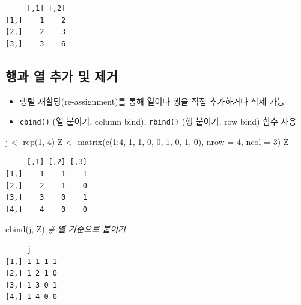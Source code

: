 \documentclass[
  11pt,
]{krantz}
\newenvironment{Shaded}{\begin{snugshade}}{\end{snugshade}}
\newcommand{\AttributeTok}[1]{\textcolor[rgb]{0.61,0.61,0.61}{#1}}
\newcommand{\CommentTok}[1]{\textcolor[rgb]{0.37,0.37,0.37}{\textit{#1}}}
\newcommand{\DecValTok}[1]{\textcolor[rgb]{0.06,0.06,0.06}{#1}}
\newcommand{\FunctionTok}[1]{\textcolor[rgb]{0,0,0}{#1}}
\newcommand{\NormalTok}[1]{#1}
\newcommand{\OtherTok}[1]{\textcolor[rgb]{0.37,0.37,0.37}{#1}}
\newcommand{\SpecialCharTok}[1]{\textcolor[rgb]{0,0,0}{#1}}
\providecommand{\tightlist}{%
  \setlength{\itemsep}{0pt}\setlength{\parskip}{0pt}}
\begin{document}
\begin{verbatim}
     [,1] [,2]
[1,]    1    2
[2,]    2    3
[3,]    3    6
\end{verbatim}

\normalsize

\hypertarget{uxd589uxacfc-uxc5f4-uxcd94uxac00-uxbc0f-uxc81cuxac70}{%
\subsection{행과 열 추가 및 제거}\label{uxd589uxacfc-uxc5f4-uxcd94uxac00-uxbc0f-uxc81cuxac70}}

\begin{itemize}
\tightlist
\item
  행렬 재할당(re-assignment)를 통해 열이나 행을 직접 추가하거나 삭제 가능
\item
  \texttt{cbind()} (열 붙이기, column bind), \texttt{rbind()} (행 붙이기, row bind) 함수 사용
\end{itemize}

\footnotesize

\begin{Shaded}
\begin{Highlighting}[]
\NormalTok{j }\OtherTok{\textless{}{-}} \FunctionTok{rep}\NormalTok{(}\DecValTok{1}\NormalTok{, }\DecValTok{4}\NormalTok{)}
\NormalTok{Z }\OtherTok{\textless{}{-}} \FunctionTok{matrix}\NormalTok{(}\FunctionTok{c}\NormalTok{(}\DecValTok{1}\SpecialCharTok{:}\DecValTok{4}\NormalTok{, }\DecValTok{1}\NormalTok{, }\DecValTok{1}\NormalTok{, }\DecValTok{0}\NormalTok{, }\DecValTok{0}\NormalTok{, }\DecValTok{1}\NormalTok{, }\DecValTok{0}\NormalTok{, }\DecValTok{1}\NormalTok{, }\DecValTok{0}\NormalTok{), }\AttributeTok{nrow =} \DecValTok{4}\NormalTok{, }\AttributeTok{ncol =} \DecValTok{3}\NormalTok{)}
\NormalTok{Z}
\end{Highlighting}
\end{Shaded}

\begin{verbatim}
     [,1] [,2] [,3]
[1,]    1    1    1
[2,]    2    1    0
[3,]    3    0    1
[4,]    4    0    0
\end{verbatim}

\begin{Shaded}
\begin{Highlighting}[]
\FunctionTok{cbind}\NormalTok{(j, Z) }\CommentTok{\# 열 기준으로 붙이기}
\end{Highlighting}
\end{Shaded}

\begin{verbatim}
     j      
[1,] 1 1 1 1
[2,] 1 2 1 0
[3,] 1 3 0 1
[4,] 1 4 0 0
\end{verbatim}
\end{document}
